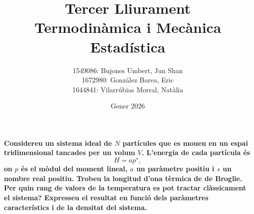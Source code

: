 \documentclass[a4paper, 10pt]{article}
\begin{document}
	\title{\Huge{\textbf{Tercer Lliurament}} \\ \vspace{0.2cm} \large{\textbf{Termodinàmica i Mecànica Estadística}}}
	
	\author{\small{1549086: Bujones Umbert, Jun Shan} \\
		\small{1672980: González Barea, Eric} \\
		\small{1644841: Vilarrúbias Morral, Natàlia}}
	\date{Gener 2026}
	\maketitle
	
	\thispagestyle{fancy}

\textbf{Considereu un sistema ideal de $N$ partícules que es mouen en un espai tridimensional tancades per un volum $V$. L'energia de cada partícula és 
\begin{equation}
	H = ap^s, \label{eq:1}
\end{equation}
on $p$ és el mòdul del moment lineal, $a$ un paràmetre positiu i $s$ un nombre real positiu. Trobeu la longitud d'ona tèrmica de de Broglie. Per quin rang de valors de la temperatura es pot tractar clàssicament el sistema? Expresseu el resultat en funció dels paràmetres característics i de la densitat del sistema.}
\end{document}
